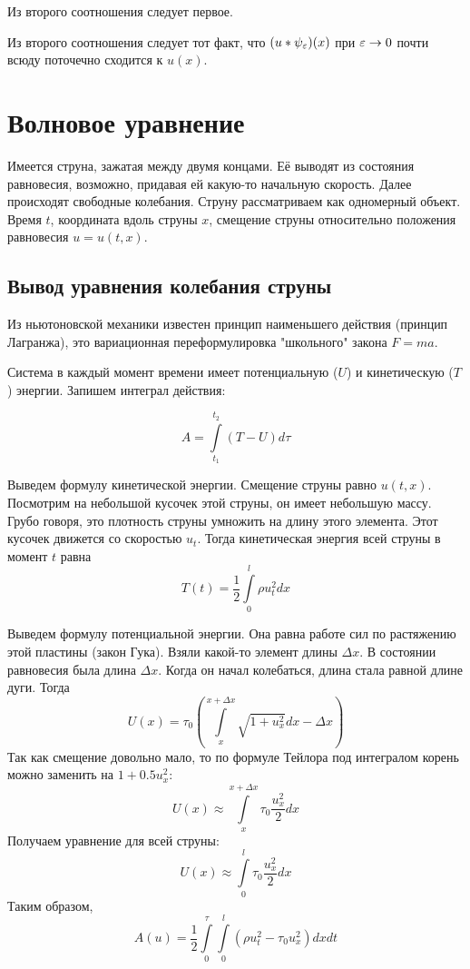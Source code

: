\begin{exercise}
Из второго соотношения следует первое.
\end{exercise}

\begin{exercise}
Из второго соотношения следует тот факт, что $(u * \psi_{\varepsilon})(x)$ при $\varepsilon \rightarrow 0$ почти всюду поточечно сходится к $u(x)$.
\end{exercise}

\section{Волновое уравнение}

Имеется струна, зажатая между двумя концами. Её выводят из состояния равновесия, возможно, придавая ей какую-то начальную скорость. Далее происходят свободные колебания. Струну рассматриваем как одномерный объект. Время $t$, координата вдоль струны $x$, смещение струны относительно положения равновесия $u = u(t, x)$.

\subsection{Вывод уравнения колебания струны}

Из ньютоновской механики известен принцип наименьшего действия (принцип Лагранжа), это вариационная переформулировка "школьного" закона $F = ma$.

Система в каждый момент времени имеет потенциальную ($U$) и кинетическую ($T$) энергии. Запишем интеграл действия:

$$ A = \int \limits_{t_1}^{t_2} (T- U) d\tau $$

Выведем формулу кинетической энергии. Смещение струны равно $u(t,x)$. Посмотрим на небольшой кусочек этой струны, он имеет  небольшую массу. Грубо говоря, это плотность струны умножить на длину этого элемента. Этот кусочек движется со скоростью $u_t$. Тогда кинетическая энергия всей струны в момент $t$ равна
$$ T(t) = \frac {1} {2} \int \limits_0^l \rho u_t^2 dx$$

Выведем формулу потенциальной энергии. Она равна работе сил по растяжению этой пластины (закон Гука). Взяли какой-то элемент длины $\Delta x$. В состоянии равновесия была длина $\Delta x$. Когда он начал колебаться, длина стала равной длине дуги.
Тогда
$$ U(x) = \tau_0 ( \int \limits_x^{x+\Delta x} \sqrt{1 + u_x^2} dx - \Delta x ) $$
Так как смещение довольно мало, то по формуле Тейлора под интегралом корень можно заменить на $ 1 + 0.5 u_x^2 $:
$$ U(x) \approx \int \limits_x^{x+\Delta x} \tau_0  \frac {u_x^2} {2} dx  $$
Получаем уравнение для всей струны:
$$ U(x) \approx \int \limits_0^l \tau_0 \frac {u_x^2} {2} dx $$
Таким образом,
$$ A(u) = \frac {1} {2} \int \limits_0^{\tau}  \int \limits_0^l (\rho u_t^2 - \tau_0 u_x^2) dx dt$$

